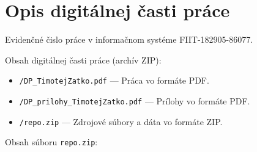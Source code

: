 \chapter{Opis digitálnej časti práce \label{cha:cdrom}}

\setcounter{page}{1}

Evidenčné čislo práce v informačnom systéme FIIT-182905-86077.

Obsah digitálnej časti práce (archív ZIP):

\begin{itemize}
    \item \texttt{/DP\_TimotejZatko.pdf} --- Práca vo formáte PDF.
    \item \texttt{/DP\_prilohy\_TimotejZatko.pdf} --- Prílohy vo formáte PDF.
    \item \texttt{/repo.zip} --- Zdrojové súbory a dáta vo formáte ZIP.
\end{itemize}

Obsah súboru \texttt{repo.zip}:

